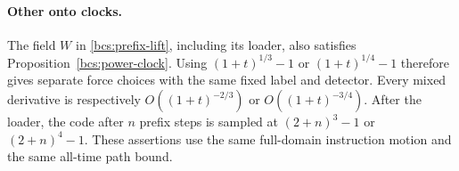 \paragraph{Other onto clocks.}
The field $W$ in \eqref{bcs:prefix-lift}, including its loader, also satisfies Proposition~\ref{bcs:power-clock}. Using $(1+t)^{1/3}-1$ or $(1+t)^{1/4}-1$ therefore gives separate force choices with the same fixed label and detector. Every mixed derivative is respectively $O((1+t)^{-2/3})$ or $O((1+t)^{-3/4})$. After the loader, the code after $n$ prefix steps is sampled at $(2+n)^3-1$ or $(2+n)^4-1$. These assertions use the same full-domain instruction motion and the same all-time path bound.
